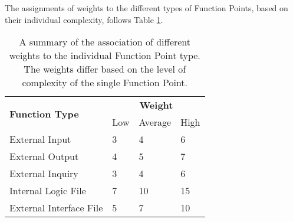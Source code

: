 The assignments of weights to the different types of Function Points, based on their individual complexity, follows Table \ref{fps_weights}.

\begin{table}[H]
    \centering
    \begin{tabular}{ l | l | l | l }
        \hline
        \multirow{2}{*}{\textbf{Function Type}} & \multicolumn{3}{c}{\textbf{Weight}} \\
        \cline{2-4}
        & Low & Average & High \\
        \hline
        \hline
        External Input          & 3     & 4     & 6     \\
        \hline
        External Output         & 4     & 5     & 7     \\
        \hline
        External Inquiry        & 3     & 4     & 6     \\
        \hline
        Internal Logic File     & 7     & 10    & 15    \\
        \hline
        External Interface File & 5     & 7     & 10    \\
        \hline
    \end{tabular}
    \caption{A summary of the association of different weights to the individual Function Point type. The weights differ based on the level of complexity of the single Function Point.}
    \label{fps_weights}
\end{table}

